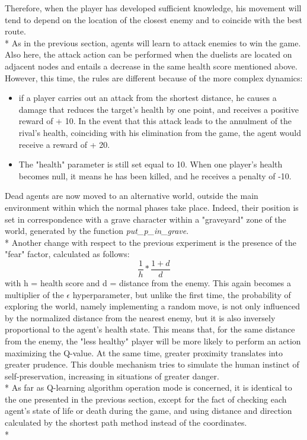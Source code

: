 Therefore, when the player has developed sufficient knowledge, his movement will tend to depend on the location of the closest enemy and to coincide with the best route.\\*
As in the previous section, agents will learn to attack enemies to win the game. Also here, the attack action can be performed when the duelists are located on adjacent nodes and entails a decrease in the same health score mentioned above. However, this time, the rules are different because of the more complex dynamics:
\begin{itemize}
  \item if a player carries out an attack from the shortest distance, he causes a damage that reduces the target's health by one point, and receives a positive reward of + 10. In the event that this attack leads to the annulment of the rival's health, coinciding with his elimination from the game, the agent would receive a reward of + 20.
  \item The "health" parameter is still set equal to 10. When one player's health becomes null, it means he has been killed, and he receives a penalty of -10.
\end{itemize}
Dead agents are now moved to an alternative world, outside the main environment within which the normal phases take place. Indeed, their position is set in correspondence with a grave character within a "graveyard" zone of the world, generated by the function \textit{put\_p\_in\_grave}.\\*
Another change with respect to the previous experiment is the presence of the "fear" factor, calculated as follows:
$$\frac{1}{h}*\frac{1+d}{d}$$
with h = health score and d = distance from the enemy.
This again becomes a multiplier of the $\epsilon$ hyperparameter, but unlike the first time, the probability of exploring the world, namely implementing a random move, is not only influenced by the normalized distance from the nearest enemy, but it is also inversely proportional to the agent's health state. This means that, for the same distance from the enemy, the "less healthy" player will be more likely to perform an action maximizing the Q-value. At the same time, greater 	proximity translates into greater prudence. This double mechanism tries to simulate the human instinct of self-preservation, increasing in situations of greater danger.\\*
As far as Q-learning algorithm operation mode is concerned, it is identical to the one presented in the previous section, except for the fact of checking each agent's state of life or death during the game, and using distance and direction calculated by the shortest path method instead of the coordinates.\\*
